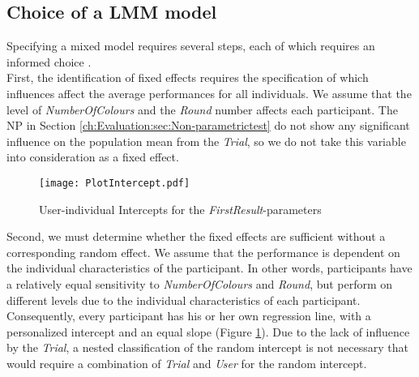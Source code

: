 \subsection{Choice of a \ac{LMM} model}
Specifying a mixed model requires several steps, each of which requires an informed choice \citep{Seltman2012}. \\
First, the identification of  fixed effects requires the specification of which influences affect the average performances for all individuals.  We assume that the level of \textit{NumberOfColours} and the \textit{Round} number affects each participant.
The \acl{NP} in Section \ref{ch:Evaluation:sec:Non-parametrictest} do not show any significant influence on the population mean from the \textit{Trial}, so we do not take this variable into consideration as a fixed effect.\\
\begin{figure}[htbp] %
\begin{center} 
\texttt{[image: PlotIntercept.pdf]}
  \caption{User-individual Intercepts for the \textit{FirstResult}-parameters}
    \label{fig:Intercepts} 
\end{center}
\end{figure}
Second, we must determine whether the fixed effects are sufficient without a corresponding random effect. We assume that the performance is dependent on the individual characteristics of the participant. In other words, participants have a relatively equal sensitivity to \textit{NumberOfColours} and \textit{Round}, but perform on different levels due to the individual characteristics of each participant. Consequently, every participant has his or her own regression line, with a personalized intercept and an equal slope (Figure \ref{fig:Intercepts}). Due to the lack of influence by the \textit{Trial}, a nested classification of the random intercept is not necessary that would require a combination of \textit{Trial} and \textit{User} for the random intercept.\\
